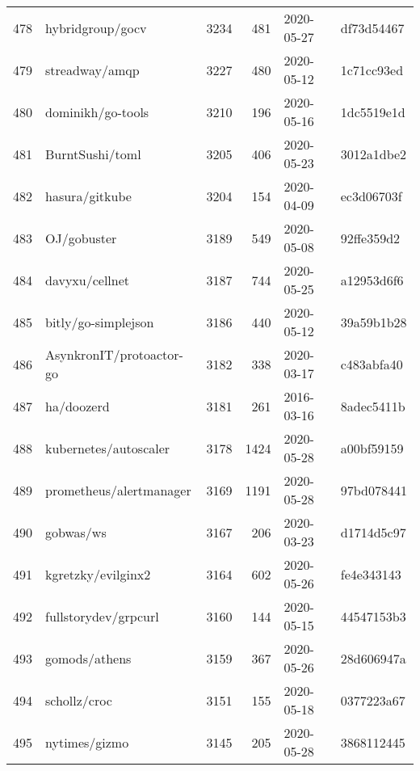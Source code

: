 \begin{longtable}{llrrll}
    478 &                                   hybridgroup/gocv &   3234 &    481 & 2020-05-27 &  df73d54467 \\
    479 &                                     streadway/amqp &   3227 &    480 & 2020-05-12 &  1c71cc93ed \\
    480 &                                  dominikh/go-tools &   3210 &    196 & 2020-05-16 &  1dc5519e1d \\
    481 &                                    BurntSushi/toml &   3205 &    406 & 2020-05-23 &  3012a1dbe2 \\
    482 &                                     hasura/gitkube &   3204 &    154 & 2020-04-09 &  ec3d06703f \\
    483 &                                        OJ/gobuster &   3189 &    549 & 2020-05-08 &  92ffe359d2 \\
    484 &                                     davyxu/cellnet &   3187 &    744 & 2020-05-25 &  a12953d6f6 \\
    485 &                                bitly/go-simplejson &   3186 &    440 & 2020-05-12 &  39a59b1b28 \\
    486 &                           AsynkronIT/protoactor-go &   3182 &    338 & 2020-03-17 &  c483abfa40 \\
    487 &                                         ha/doozerd &   3181 &    261 & 2016-03-16 &  8adec5411b \\
    488 &                              kubernetes/autoscaler &   3178 &   1424 & 2020-05-28 &  a00bf59159 \\
    489 &                            prometheus/alertmanager &   3169 &   1191 & 2020-05-28 &  97bd078441 \\
    490 &                                          gobwas/ws &   3167 &    206 & 2020-03-23 &  d1714d5c97 \\
    491 &                                 kgretzky/evilginx2 &   3164 &    602 & 2020-05-26 &  fe4e343143 \\
    492 &                               fullstorydev/grpcurl &   3160 &    144 & 2020-05-15 &  44547153b3 \\
    493 &                                      gomods/athens &   3159 &    367 & 2020-05-26 &  28d606947a \\
    494 &                                       schollz/croc &   3151 &    155 & 2020-05-18 &  0377223a67 \\
    495 &                                      nytimes/gizmo &   3145 &    205 & 2020-05-28 &  3868112445 \\

\end{longtable}
